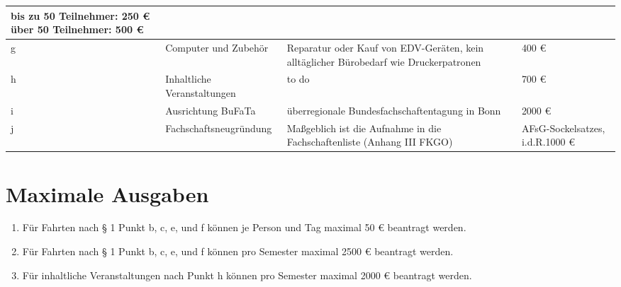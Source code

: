\documentclass[11pt]{article}
\begin{document}
\begin{center}
\begin{tabular}{l|L{4,5 cm}|L{5cm}|L{4,5cm}}
     bis zu 50 Teilnehmer: 250 € \newline über 50 Teilnehmer: 500 € \\ \hline
     g&Computer und Zubehör & Reparatur oder Kauf von EDV-Geräten, kein alltäglicher Bürobedarf wie Druckerpatronen & 400 € \\ \hline
     h&Inhaltliche Veranstaltungen & to do & 700 € \\ \hline
     i&Ausrichtung BuFaTa & überregionale Bundesfachschaftentagung in Bonn & 2000 € \\ \hline
     j&Fachschaftsneugründung & Maßgeblich ist die Aufnahme in die Fachschaftenliste (Anhang III FKGO) & AFsG-Sockelsatzes, i.d.R.1000 € \\
\end{tabular}
\end{center}
\pagebreak

\rmfamily
\section{Maximale Ausgaben}
\begin{enumerate}[(1)]
    \item Für Fahrten nach § 1 Punkt b, c, e, und f können je Person und Tag maximal 50 € beantragt werden.
    \item Für Fahrten nach § 1 Punkt b, c, e, und f können pro Semester maximal 2500 € beantragt werden.
    \item Für inhaltliche Veranstaltungen nach Punkt h können pro Semester maximal 2000 € beantragt werden.
\end{enumerate}
\end{document}
